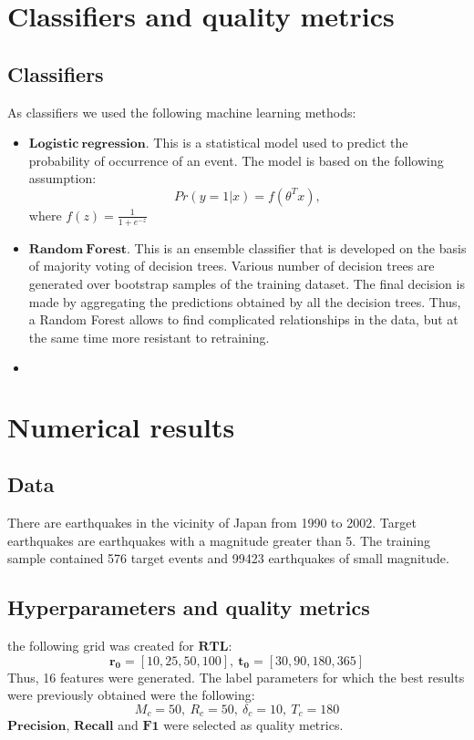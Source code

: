 \documentclass[12pt]{article}
\let\vec=\mathbf
\begin{document}
\section{Classifiers and quality metrics}
\subsection{Classifiers}
As classifiers we used the following machine learning methods:
\begin{itemize}
\item $\vec{Logistic~regression}$. This is a statistical model used to predict the probability of occurrence of an event. The model is based on the following assumption:
\begin{equation}
	Pr(y=1|x)=f(\theta^Tx),
\end{equation} 
where $f(z)=\frac{1}{1+e^{-z}}$
\item $\vec{Random~Forest}$. This is an ensemble classifier that is developed on the basis of majority voting of decision trees. Various number of decision trees are generated over bootstrap
samples of the training dataset. The final decision is made by aggregating the predictions obtained by all the decision trees. Thus, a Random Forest allows to find complicated relationships in the data, but at the same time more resistant to retraining. 
\item $\vec{}$
\end{itemize}
\section{Numerical results}
\subsection{Data}
There are earthquakes in the vicinity of Japan from 1990 to 2002. Target earthquakes are earthquakes with a magnitude greater than 5. The training sample contained 576 target events and 99423 earthquakes of small magnitude.
\subsection{Hyperparameters and quality metrics}
the following grid was created for $\vec{RTL}$:
$$\vec{r_0}=[10,25,50,100],~ \vec{t_0}=[30,90,180,365]$$
Thus, 16 features were generated. The label parameters for which the best results were previously obtained were the following:
$$M_c = 50,~R_c = 50,~\delta_c=10,~T_c=180$$
$\vec{Precision}$, $\vec{Recall}$ and $\vec{F1}$ were selected as quality metrics.
\end{document}
